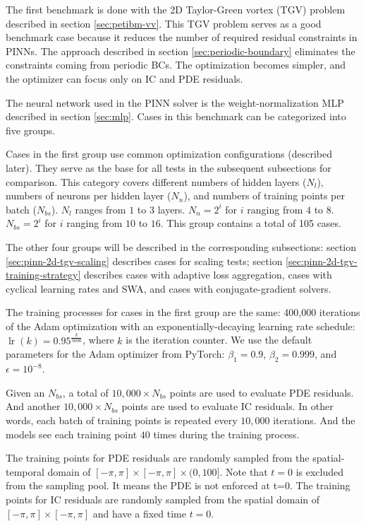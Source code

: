 
The first benchmark is done with the 2D Taylor-Green vortex (TGV) problem described in section \ref{sec:petibm-vv}.
This TGV problem serves as a good benchmark case because it reduces the number of required residual constraints in PINNs.
The approach described in section \ref{sec:periodic-boundary} eliminates the constraints coming from periodic BCs.
The optimization becomes simpler, and the optimizer can focus only on IC and PDE residuals.

The neural network used in the PINN solver is the weight-normalization MLP described in section \ref{sec:mlp}.
Cases in this benchmark can be categorized into five groups.

Cases in the first group use common optimization configurations (described later).
They serve as the base for all tests in the subsequent subsections for comparison.
This category covers different numbers of hidden layers ($N_l$), numbers of neurons per hidden layer ($N_n$), and numbers of training points per batch ($N_{bs}$).
$N_l$ ranges from $1$ to $3$ layers.
$N_n=2^i$ for $i$ ranging from $4$ to $8$.
$N_{bs}=2^i$ for $i$ ranging from $10$ to $16$.
This group contains a total of 105 cases.

The other four groups will be described in the corresponding subsections: section \ref{sec:pinn-2d-tgv-scaling} describes cases for scaling tests; section \ref{sec:pinn-2d-tgv-training-strategy} describes cases with adaptive loss aggregation, cases with cyclical learning rates and SWA, and cases with conjugate-gradient solvers.

The training processes for cases in the first group are the same: 400,000 iterations of the Adam optimization with an exponentially-decaying learning rate schedule: $\operatorname{lr}(k) = 0.95^\frac{k}{5000}$, where $k$ is the iteration counter.
We use the default parameters for the Adam optimizer from PyTorch: $\beta_1=0.9$, $\beta_2=0.999$, and $\epsilon=10^{-8}$.

Given an $N_{bs}$, a total of $10,000 \times N_{bs}$ points are used to evaluate PDE residuals.
And another $10,000 \times N_{bs}$ points are used to evaluate IC residuals.
In other words, each batch of training points is repeated every $10,000$ iterations.
And the models see each training point $40$ times during the training process.

The training points for PDE residuals are randomly sampled from the spatial-temporal domain of $[-\pi, \pi]\times[-\pi, \pi]\times(0, 100]$.
Note that $t=0$ is excluded from the sampling pool.
It means the PDE is not enforced at t=0.
The training points for IC residuals are randomly sampled from the spatial domain of $[-\pi, \pi]\times[-\pi, \pi]$ and have a fixed time $t=0$.

